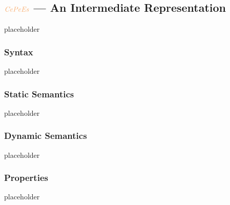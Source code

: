 \subsection{$\irl{CePeEs}$ --- An Intermediate Representation}\label{subsec-cepees}
placeholder
\subsubsection{Syntax}\label{subsec-cepees-syntax}
placeholder
\subsubsection{Static Semantics}\label{subsec-cepees-static}
placeholder
\subsubsection{Dynamic Semantics}\label{subsec-cepees-dynamic}
placeholder
\subsubsection{Properties}\label{subsec-cepees-properties}
placeholder
